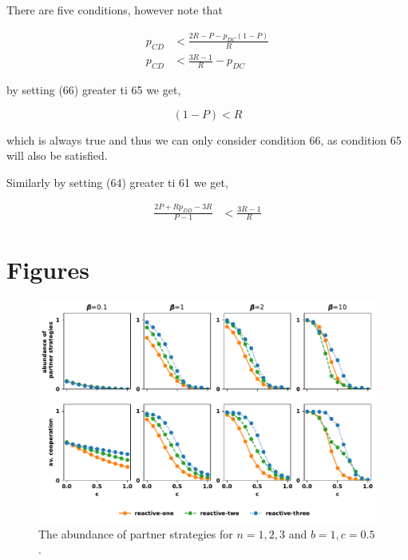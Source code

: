 \documentclass{article}
\theoremstyle{definition}
\begin{document}
There are five conditions, however note that 

\begin{align}
p_{CD}  & < \frac{2 R - P - p_{DC} \left(1 - P\right)}{R}\\
p_{CD} & < \frac{3 R - 1}{R} - p_{DC}
\end{align}

by setting (66) greater ti 65 we get,

\begin{equation*}
  (1 - P) < R
\end{equation*}

which is always true and thus we can only consider condition 66, as condition
65 will also be satisfied.

Similarly by setting (64) greater ti 61 we get,


\begin{align}
  \frac{2 P + R p_{DD} - 3 R}{P - 1}  & < \frac{3 R - 1}{R}
\end{align} 

\section{Figures}


\begin{figure}[!htbp]
  \includegraphics[width=\textwidth]{figures/abundance_of_partner_strategies.pdf}
  \caption{The abundance of partner strategies for $n=1,2,3$ and $b=1, c=0.5$.}
\end{figure}
\end{document}
